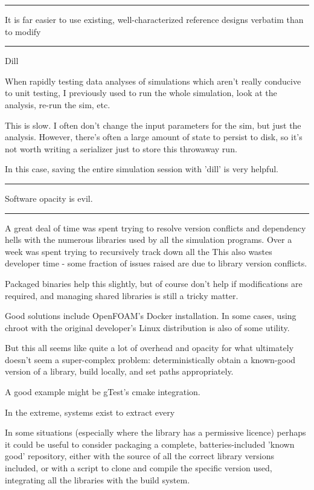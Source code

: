 \documentclass[paper.tex]{subfiles}
\begin{document}
\rule{\linewidth}{0.2pt}

It is far easier to use existing, well-characterized reference designs verbatim than to modify 

\rule{\linewidth}{0.2pt}

Dill

When rapidly testing data analyses of simulations which aren't really conducive to unit testing, I previously used to run the whole simulation, look at the analysis, re-run the sim, etc.

This is slow. I often don't change the input parameters for the sim, but just the analysis. However, there's often a large amount of state to persist to disk, so it's not worth writing a serializer just to store this throwaway run.

In this case, saving the entire simulation session with 'dill' is very helpful.

\rule{\linewidth}{0.2pt}

Software opacity is evil.

\rule{\linewidth}{0.2pt}

A great deal of time was spent trying to resolve version conflicts and dependency hells with the numerous libraries used by all the simulation programs. Over a week was spent trying to recursively track down all the This also wastes developer time - some fraction of issues raised are due to library version conflicts. 

Packaged binaries help this slightly, but of course don't help if modifications are required, and managing shared libraries is still a tricky matter.

Good solutions include OpenFOAM's Docker installation. In some cases, using chroot with the original developer's Linux distribution is also of some utility.

But this all seems like quite a lot of overhead and opacity for what ultimately doesn't seem a super-complex problem: deterministically obtain a known-good version of a library, build locally, and set paths appropriately.

A good example might be gTest's cmake integration.

In the extreme, systems exist to extract every 

In some situations (especially where the library has a permissive licence) perhaps it could be useful to consider packaging a complete, batteries-included 'known good' repository, either with the source of all the correct library versions included, or with a script to clone and compile the specific version used, integrating all the libraries with the build system. 
\end{document}
